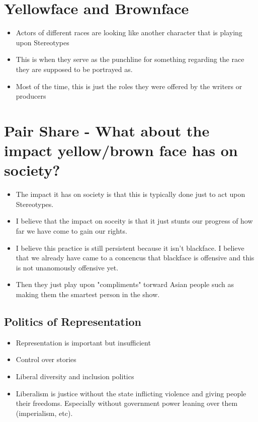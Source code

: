 \documentclass{article}
\begin{document}
\section*{Yellowface and Brownface}
\begin{itemize}
  \item Actors of different races are looking like another character
    that is playing upon Stereotypes
  \item This is when they serve as the punchline for something
    regarding the race they are supposed to be portrayed as.
  \item Most of the time, this is just the roles they were offered by 
    the writers or producers
\end{itemize}

\section*{Pair Share - What about the impact yellow/brown face has on society? }
\begin{itemize}
  \item The impact it has on society is that this is typically done
    just to act upon Stereotypes.
  \item I believe that the impact on soceity is that it just
    stunts our progress of how far we have come to gain our rights.
  \item I believe this practice is still persistent because it isn't
    blackface. I believe that we already have came to a concencus that blackface
    is offensive and this is not unanomously offensive yet.
  \item Then they just play upon "compliments" torward Asian
    people such as making them the smartest person in the show.
\end{itemize}

\subsection{Politics of Representation}
\begin{itemize}
  \item Representation is important but insufficient
  \item Control over stories
  \item Liberal diversity and inclusion politics
  \item Liberalism is justice without the state inflicting violence
    and giving people their freedoms. 
    Especially without government power leaning over them (imperialism, etc).
\end{itemize}
\end{document}
